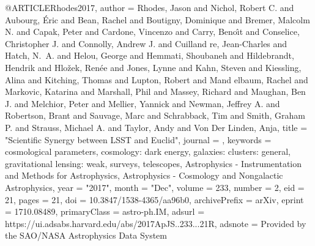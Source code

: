 \documentclass{aa}
\begin{document}
{{{{{{{{{{{{{{@ARTICLE{Rhodes2017,
       author = {{Rhodes}, Jason and {Nichol}, Robert C. and {Aubourg}, {\'E}ric and
         {Bean}, Rachel and {Boutigny}, Dominique and {Bremer}, Malcolm N. and
         {Capak}, Peter and {Cardone}, Vincenzo and {Carry}, Beno{\^\i}t and
         {Conselice}, Christopher J. and {Connolly}, Andrew J. and {Cuilland
        re}, Jean-Charles and {Hatch}, N.~A. and {Helou}, George and
         {Hemmati}, Shoubaneh and {Hildebrandt}, Hendrik and
         {Hlo{\v{z}}ek}, Ren{\'e}e and {Jones}, Lynne and {Kahn}, Steven and
         {Kiessling}, Alina and {Kitching}, Thomas and {Lupton}, Robert and {Mand
        elbaum}, Rachel and {Markovic}, Katarina and {Marshall}, Phil and
         {Massey}, Richard and {Maughan}, Ben J. and {Melchior}, Peter and
         {Mellier}, Yannick and {Newman}, Jeffrey A. and {Robertson}, Brant and
         {Sauvage}, Marc and {Schrabback}, Tim and {Smith}, Graham P. and
         {Strauss}, Michael A. and {Taylor}, Andy and {Von Der Linden}, Anja},
        title = "{Scientific Synergy between LSST and Euclid}",
      journal = {\apjs},
     keywords = {cosmological parameters, cosmology: dark energy, galaxies: clusters: general, gravitational lensing: weak, surveys, telescopes, Astrophysics - Instrumentation and Methods for Astrophysics, Astrophysics - Cosmology and Nongalactic Astrophysics},
         year = "2017",
        month = "Dec",
       volume = {233},
       number = {2},
          eid = {21},
        pages = {21},
          doi = {10.3847/1538-4365/aa96b0},
archivePrefix = {arXiv},
       eprint = {1710.08489},
 primaryClass = {astro-ph.IM},
       adsurl = {https://ui.adsabs.harvard.edu/abs/2017ApJS..233...21R},
      adsnote = {Provided by the SAO/NASA Astrophysics Data System}
}

}}}}}}}}}}}}}}
\end{document}
